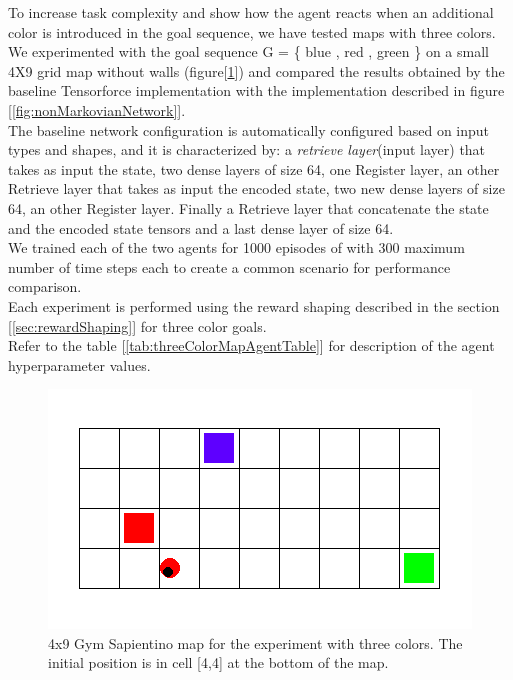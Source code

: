 \documentclass{article}
\begin{document}
To increase task complexity and show how the agent reacts when an additional color is introduced in the goal sequence, we have tested maps with three colors. 
We experimented with the goal sequence  G = \{\color{blue} blue \color{black}, \color{red} red \color{black},\color{green} green \color{black}\} on a small 4X9 grid map without walls (figure[\ref{fig:mapThreeColors}]) and compared the results obtained by the baseline Tensorforce implementation with the implementation described in figure [\ref{fig:nonMarkovianNetwork}]. \\

The baseline network configuration is automatically configured based on input types and shapes, and it is characterized by: a \textit{retrieve layer}(input layer) that takes as input the state, two dense layers of size 64, one Register layer, an other Retrieve layer that takes as input the encoded state, two new dense layers of size 64, an other Register layer. Finally a Retrieve layer that concatenate the state and the encoded state tensors and a last dense layer of size 64.\\

We trained each of the two agents for 1000 episodes of with 300 maximum number of time steps each to create a common scenario for performance comparison. \\


Each experiment is performed using the reward shaping described in the section [\ref{sec:rewardShaping}] for three color goals.\\
Refer to the table [\ref{tab:threeColorMapAgentTable}] for description of the agent hyperparameter values.\\



\begin{figure}[ht]
  \centering
  \includegraphics[width=\textwidth]{images/map3_easy.png}
\caption{4x9 Gym Sapientino map for the experiment with three colors. The initial position is in cell [4,4] at the bottom of the map.}
\label{fig:mapThreeColors}
\end{figure}
\end{document}
